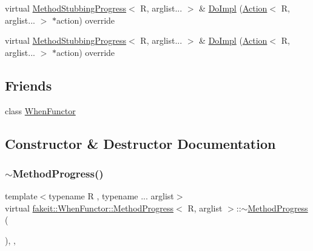 \begin{DoxyCompactItemize}
\item 
virtual \mbox{\hyperlink{structfakeit_1_1MethodStubbingProgress}{Method\+Stubbing\+Progress}}$<$ R, arglist... $>$ \& \mbox{\hyperlink{structfakeit_1_1WhenFunctor_1_1MethodProgress_a4b8a947b1514fe715743ee8e65953d9d}{Do\+Impl}} (\mbox{\hyperlink{structfakeit_1_1Action}{Action}}$<$ R, arglist... $>$ $\ast$action) override
\item 
virtual \mbox{\hyperlink{structfakeit_1_1MethodStubbingProgress}{Method\+Stubbing\+Progress}}$<$ R, arglist... $>$ \& \mbox{\hyperlink{structfakeit_1_1WhenFunctor_1_1MethodProgress_a4b8a947b1514fe715743ee8e65953d9d}{Do\+Impl}} (\mbox{\hyperlink{structfakeit_1_1Action}{Action}}$<$ R, arglist... $>$ $\ast$action) override
\end{DoxyCompactItemize}
\subsection*{Friends}
\begin{DoxyCompactItemize}
\item 
class \mbox{\hyperlink{structfakeit_1_1WhenFunctor_1_1MethodProgress_ae041ecdb9ca5786188a1b551a25cefd5}{When\+Functor}}
\end{DoxyCompactItemize}


\subsection{Constructor \& Destructor Documentation}
\mbox{\label{structfakeit_1_1WhenFunctor_1_1MethodProgress_a5bdc18cb6924dc88bc110a15aac37455}} 
\subsubsection{\texorpdfstring{$\sim$MethodProgress()}{~MethodProgress()}\hspace{0.1cm}{\footnotesize\ttfamily [1/9]}}
{\footnotesize\ttfamily template$<$typename R , typename ... arglist$>$ \\
virtual \mbox{\hyperlink{structfakeit_1_1WhenFunctor_1_1MethodProgress}{fakeit\+::\+When\+Functor\+::\+Method\+Progress}}$<$ R, arglist $>$\+::$\sim$\mbox{\hyperlink{structfakeit_1_1WhenFunctor_1_1MethodProgress}{Method\+Progress}} (\begin{DoxyParamCaption}{ }\end{DoxyParamCaption})\hspace{0.3cm}{\ttfamily [override]}, {\ttfamily [virtual]}, {\ttfamily [default]}}

